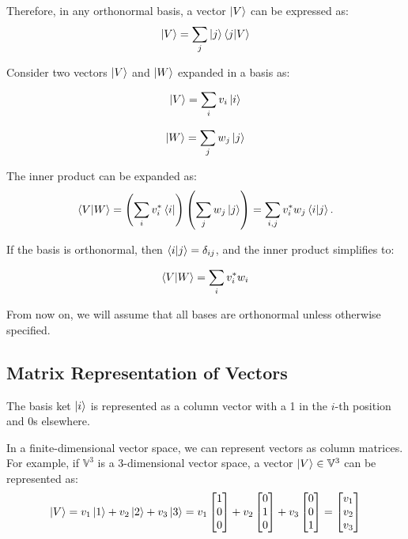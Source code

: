 \documentclass[12pt,a4paper]{report}
\newcommand{\vecspace}[1]{\mathbb{#1}}
\begin{document}
Therefore, in any orthonormal basis, a vector $\ket{V}$ can be expressed as:
\begin{equation*}
    \ket{V} = \sum_{j} \ket{j}\bra{j}\ket{V}
\end{equation*}

Consider two vectors $\ket{V}$ and $\ket{W}$ expanded in a basis as:

\begin{equation*}
    \ket{V} = \sum_{i} v_i \ket{i}
\end{equation*}

\begin{equation*}
    \ket{W} = \sum_{j} w_j \ket{j}
\end{equation*}

The inner product can be expanded as:
\begin{equation*}
    \bra{V}\ket{W} = \left( \sum_{i} v_i^* \bra{i} \right) \left( \sum_{j} w_j \ket{j} \right) = \sum_{i,j} v_i^* w_j \bra{i}\ket{j}.
\end{equation*}

If the basis is orthonormal, then $\bra{i}\ket{j} = \delta_{ij}$, and the inner product simplifies to:

\begin{equation*}
    \bra{V}\ket{W} = \sum_{i} v_i^* w_i
\end{equation*}

From now on, we will assume that all bases are orthonormal unless otherwise specified.

\subsection{Matrix Representation of Vectors}

The basis ket $\ket{i}$ is represented as a column vector with a 1 in the $i$-th position and 0s elsewhere.

In a finite-dimensional vector space, we can represent vectors as column matrices. For example, if $\vecspace{V}^3$ is a 3-dimensional vector space, a vector $\ket{V} \in \vecspace{V}^3$ can be represented as:
\begin{equation*}
    \ket{V} = v_1 \ket{1} + v_2 \ket{2} + v_3 \ket{3} = v_1 \begin{bmatrix}
        1 \\
        0 \\
        0
    \end{bmatrix} + v_2 \begin{bmatrix}
        0 \\
        1 \\
        0
    \end{bmatrix} + v_3 \begin{bmatrix}
        0 \\
        0 \\
        1
    \end{bmatrix} = \begin{bmatrix}
        v_1 \\
        v_2 \\
        v_3
    \end{bmatrix}
\end{equation*}
\end{document}

